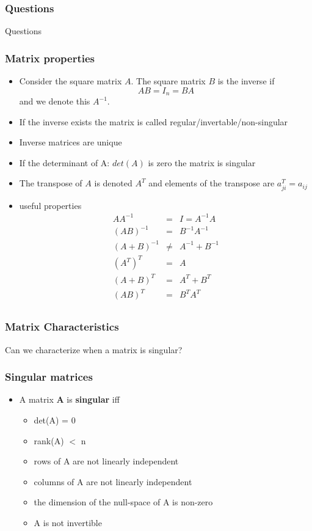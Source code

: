 \documentclass[10pt]{beamer}
\begin{document}
\begin{frame}
  \frametitle{Questions}
  \centerline{\Huge Questions}
\end{frame}

\begin{frame}
  \frametitle{Matrix properties}
  \begin{itemize}
  \item Consider the square matrix $A$. The square matrix $B$ is the inverse if
    \[ AB = I_n = BA \]
    and we denote this $A^{-1}$.
  \item If the inverse exists the matrix is called regular/invertable/non-singular
  \item Inverse matrices are unique
  \item If the determinant of A: $det(A)$ is zero the matrix is singular
  \item The transpose of $A$ is denoted $A^T$ and elements of the transpose are $a^T_{ji} = a_{ij}$
  \item useful properties
    \[
      \begin{array}{ccc}
        AA^{-1}  & = & I = A^{-1}A\\
        (AB)^{-1} & = & B^{-1} A^{-1}\\
        (A+B)^{-1} & \neq & A^{-1} + B^{-1}\\
        (A^T)^T  & = & A \\
        (A+B)^T &= & A^T + B^T \\
        (AB)^T &=& B^T A^T \\
      \end{array}
    \]
  \end{itemize}
\end{frame}

\begin{frame}
  \frametitle{Matrix Characteristics}
  \vfill
  \centerline{Can we characterize when a matrix is singular?}
  \vfill
\end{frame}

\begin{frame}
  \frametitle{Singular matrices}
  \begin{itemize}
  \item A matrix $\mathbf{A}$ is {\bf singular} iff
    \begin{itemize}
    \item det(A) = 0
    \item rank(A) $<$ n
    \item rows of A are not linearly independent
    \item columns of A are not linearly independent
    \item the dimension of the null-space of A is non-zero
    \item A is not invertible
    \end{itemize}
  \end{itemize}
\end{frame}
\end{document}
